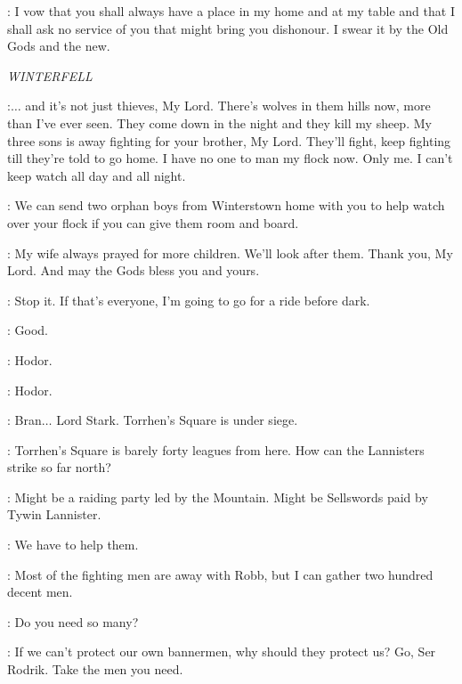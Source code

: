 
\CATELYN: I vow that you shall always have a place in my home and at my table and that I shall ask no service of you that might bring you dishonour. I swear it by the Old Gods and the new. 



\scene

\textit{WINTERFELL} 


\FARMER:$\ldots$ and it's not just thieves, My Lord. There's wolves in them hills now, more than I've ever seen. They come down in the night and they kill my sheep. My three sons is away fighting for your brother, My Lord. They'll fight, keep fighting till they're told to go home. I have no one to man my flock now. Only me. I can't keep watch all day and all night. 

\BRAN: We can send two orphan boys from Winterstown home with you to help watch over your flock if you can give them room and board. 

\FARMER: My wife always prayed for more children. We'll look after them. Thank you, My Lord. And may the Gods bless you and yours. 

\BRAN:  Stop it.  If that's everyone, I'm going to go for a ride before dark. 

\LUWIN: Good. 

\BRAN: Hodor. 


\HODOR: Hodor. 


\RODRIK: Bran$\ldots$ Lord Stark. Torrhen's Square is under siege. 

\LUWIN: Torrhen's Square is barely forty leagues from here. How can the Lannisters strike so far north? 

\RODRIK: Might be a raiding party led by the Mountain. Might be Sellswords paid by Tywin Lannister. 

\BRAN: We have to help them. 

\RODRIK: Most of the fighting men are away with Robb, but I can gather two hundred decent men. 

\LUWIN: Do you need so many? 

\BRAN: If we can't protect our own bannermen, why should they protect us? Go, Ser Rodrik. Take the men you need. 

